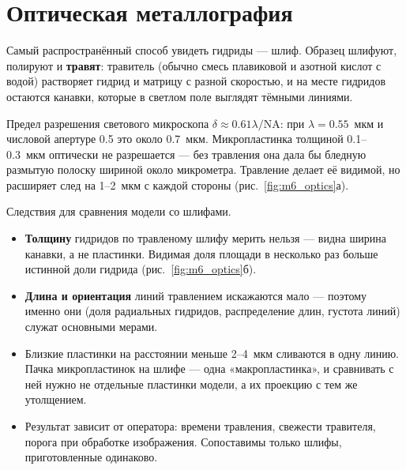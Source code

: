 \section{Оптическая металлография}

Самый распространённый способ увидеть гидриды --- шлиф. Образец шлифуют, полируют и \textbf{травят}: травитель
(обычно смесь плавиковой и азотной кислот с водой) растворяет гидрид и матрицу с разной скоростью, и на месте
гидридов остаются канавки, которые в светлом поле выглядят тёмными линиями.

Предел разрешения светового микроскопа $\delta\approx0.61\lambda/\mathrm{NA}$: при $\lambda = 0.55$~мкм и числовой апертуре
0.5 это около 0.7~мкм. Микропластинка толщиной 0.1--0.3~мкм оптически не разрешается --- без травления она дала бы
бледную размытую полоску шириной около микрометра. Травление делает её видимой, но расширяет след на 1--2~мкм с
каждой стороны (рис.~\ref{fig:m6_optics}а).


\begin{zrbox}
Следствия для сравнения модели со шлифами.
\begin{itemize}
\item \textbf{Толщину} гидридов по травленому шлифу мерить нельзя --- видна ширина канавки, а не пластинки. Видимая
  доля площади в несколько раз больше истинной доли гидрида (рис.~\ref{fig:m6_optics}б).
\item \textbf{Длина и ориентация} линий травлением искажаются мало --- поэтому именно они (доля радиальных гидридов,
  распределение длин, густота линий) служат основными мерами.
\item Близкие пластинки на расстоянии меньше 2--4~мкм сливаются в одну линию. Пачка микропластинок на шлифе ---
  одна «макропластинка», и сравнивать с ней нужно не отдельные пластинки модели, а их проекцию с тем же
  утолщением.
\item Результат зависит от оператора: времени травления, свежести травителя, порога при обработке изображения.
  Сопоставимы только шлифы, приготовленные одинаково.
\end{itemize}
\end{zrbox}

